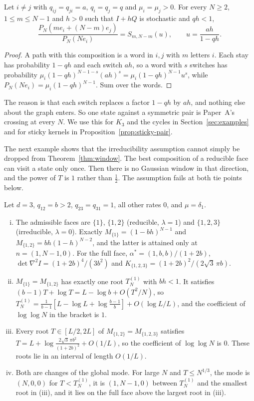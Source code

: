 \begin{proposition}\label{prop:pair}
Let $i\ne j$ with $q_{ij}=q_{ji}=a$, $q_i=q_j=q$ and $\mu_i=\mu_j>0$. For
every $N\ge2$, $1\le m\le N-1$ and $h>0$ such that $I+hQ$ is stochastic and
$qh<1$,
\[
\frac{P_N(me_i+(N-m)e_j)}{P_N(Ne_i)}=S_{m,N-m}(u),\qquad u=\frac{ah}{1-qh}.
\]
\end{proposition}

\begin{proof}
A path with this composition is a word in $i,j$ with $m$ letters $i$. Each
stay has probability $1-qh$ and each switch $ah$, so a word with $s$ switches
has probability $\mu_i(1-qh)^{N-1-s}(ah)^s=\mu_i(1-qh)^{N-1}u^s$, while
$P_N(Ne_i)=\mu_i(1-qh)^{N-1}$. Sum over the words.
\end{proof}

The reason is that each switch replaces a factor $1-qh$ by $ah$, and nothing
else about the graph enters. So one state against a symmetric pair is
Paper~A's crossing at every $N$. We use this for $K_3$ and the cycles in
Section~\ref{sec:examples} and for sticky kernels in
Proposition~\ref{prop:sticky-pair}.

The next example shows that the irreducibility assumption cannot simply be
dropped from Theorem~\ref{thm:window}. The best composition of a reducible
face can visit a state only once. Then there is no Gaussian window in that
direction, and the power of $T$ is $1$ rather than $\frac12$. The assumption
fails at both tie points below.

\begin{proposition}\label{prop:threecycle}
Let $d=3$, $q_{12}=b>2$, $q_{23}=q_{31}=1$, all other rates $0$, and
$\mu=\delta_1$.
\begin{enumerate}[(i)]
\item The admissible faces are $\{1\}$, $\{1,2\}$ (reducible, $\lambda=1$) and
$\{1,2,3\}$ (irreducible, $\lambda=0$). Exactly
$M_{\{1\}}=(1-bh)^{N-1}$ and $M_{\{1,2\}}=bh(1-h)^{N-2}$, and the latter is
attained only at $n=(1,N-1,0)$. For the full face,
$\alpha^*=(1,b,b)/(1+2b)$, $\det\nabla^2I=(1+2b)^4/(3b^2)$ and
$K_{\{1,2,3\}}=(1+2b)^2/(2\sqrt3\,\pi b)$.
\item $M_{\{1\}}=M_{\{1,2\}}$ has exactly one root $T^{(1)}_N$ with $bh<1$. It
satisfies $(b-1)T+\log T=L-\log b+O(T^2/N)$, so
$T^{(1)}_N=\frac1{b-1}[L-\log L+\log\frac{b-1}b]+O(\log L/L)$, and the
coefficient of $\log\log N$ in the bracket is $1$.
\item Every root $T\in[L/2,2L]$ of $M_{\{1,2\}}=M_{\{1,2,3\}}$ satisfies
$T=L+\log\frac{2\sqrt3\,\pi b^2}{(1+2b)^2}+O(1/L)$, so the coefficient of
$\log\log N$ is $0$. These roots lie in an interval of length $O(1/L)$.
\item Both are changes of the global mode. For large $N$ and $T\le N^{1/3}$,
the mode is $(N,0,0)$ for $T<T^{(1)}_N$, it is $(1,N-1,0)$ between
$T^{(1)}_N$ and the smallest root in (iii), and it lies on the full face above
the largest root in (iii).
\end{enumerate}
\end{proposition}

